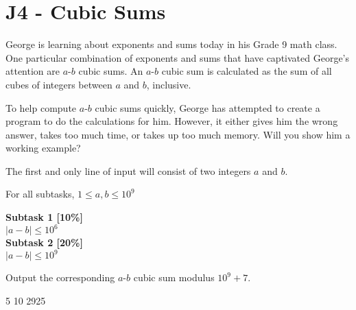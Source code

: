 \section*{J4 - Cubic Sums}
George is learning about exponents and sums today in his Grade 9 math class. One particular combination of exponents and sums that have captivated George's attention are $a$-$b$ cubic sums. An $a$-$b$ cubic sum is calculated as the sum of all cubes of integers between $a$ and $b$, inclusive.

To help compute $a$-$b$ cubic sums quickly, George has attempted to create a program to do the calculations for him. However, it either gives him the wrong answer, takes too much time, or takes up too much memory. Will you show him a working example?

The first and only line of input will consist of two integers $a$ and $b$.

\constraints
For all subtasks, $1 \leq a, b \leq 10^9$

\textbf{Subtask 1 [10\%]} \\
$|a - b| \leq 10^6$ \\

\textbf{Subtask 2 [20\%]} \\
$|a - b| \leq 10^9$

\outputformat
Output the corresponding $a$-$b$ cubic sum modulus $10^9 + 7$.

\addsample
{
    5 10
}
{
    2925
}